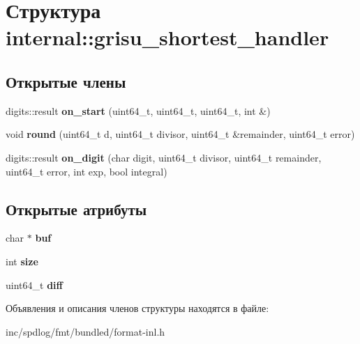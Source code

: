 \hypertarget{structinternal_1_1grisu__shortest__handler}{}\section{Структура internal\+:\+:grisu\+\_\+shortest\+\_\+handler}
\label{structinternal_1_1grisu__shortest__handler}
\subsection*{Открытые члены}
\begin{DoxyCompactItemize}
\item 
\mbox{\label{structinternal_1_1grisu__shortest__handler_ab1d1da17b79c29b75a7d0278346d39c1}} 
digits\+::result {\bfseries on\+\_\+start} (uint64\+\_\+t, uint64\+\_\+t, uint64\+\_\+t, int \&)
\item 
\mbox{\label{structinternal_1_1grisu__shortest__handler_a4fc2b91b2a346ce252332c6c71cb8e5a}} 
void {\bfseries round} (uint64\+\_\+t d, uint64\+\_\+t divisor, uint64\+\_\+t \&remainder, uint64\+\_\+t error)
\item 
\mbox{\label{structinternal_1_1grisu__shortest__handler_ac57ff9a17b27e8a6f3d8c106911ade4b}} 
digits\+::result {\bfseries on\+\_\+digit} (char digit, uint64\+\_\+t divisor, uint64\+\_\+t remainder, uint64\+\_\+t error, int exp, bool integral)
\end{DoxyCompactItemize}
\subsection*{Открытые атрибуты}
\begin{DoxyCompactItemize}
\item 
\mbox{\label{structinternal_1_1grisu__shortest__handler_a52ae8ea88c54c07f61efc42b79934fc4}} 
char $\ast$ {\bfseries buf}
\item 
\mbox{\label{structinternal_1_1grisu__shortest__handler_af9797aba7fe5fa039848205b9f40fec5}} 
int {\bfseries size}
\item 
\mbox{\label{structinternal_1_1grisu__shortest__handler_a15d35ed184f6324821959d1576619c66}} 
uint64\+\_\+t {\bfseries diff}
\end{DoxyCompactItemize}


Объявления и описания членов структуры находятся в файле\+:\begin{DoxyCompactItemize}
\item 
inc/spdlog/fmt/bundled/format-\/inl.\+h\end{DoxyCompactItemize}
